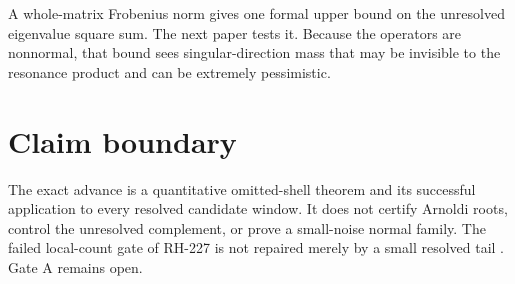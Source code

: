 \documentclass[11pt]{article}
\theoremstyle{remark}\newtheorem{remark}[theorem]{Remark}
\begin{document}
A whole-matrix Frobenius norm gives one formal upper bound on the unresolved
eigenvalue square sum. The next paper tests it. Because the operators are
nonnormal, that bound sees singular-direction mass that may be invisible to
the resonance product and can be extremely pessimistic.

\section{Claim boundary}

The exact advance is a quantitative omitted-shell theorem and its successful
application to every resolved candidate window. It does not certify Arnoldi
roots, control the unresolved complement, or prove a small-noise normal
family. The failed local-count gate of RH-227 is not repaired merely by a
small resolved tail \citep{WangRH227}. Gate A remains open.



\end{document}
